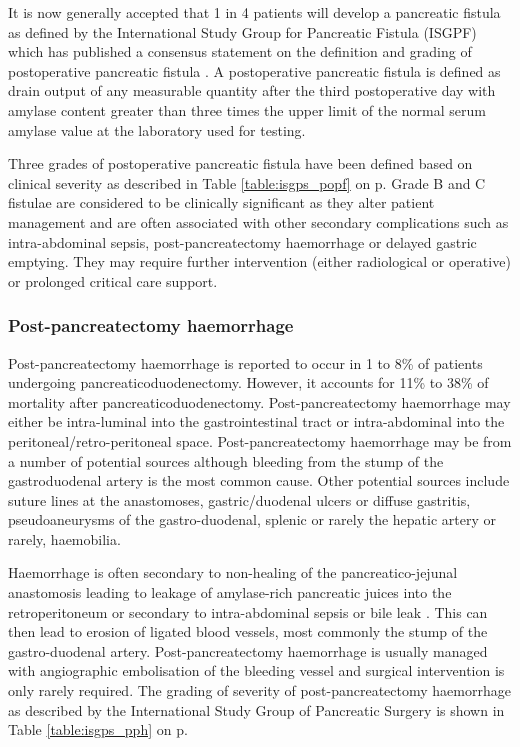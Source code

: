 It is now generally accepted that 1 in 4 patients will develop a pancreatic fistula as defined by the International Study Group for Pancreatic Fistula (ISGPF) which has published a consensus statement on the definition and grading of postoperative pancreatic fistula \parencite{bassi_postoperative_2005}. 
A postoperative pancreatic fistula is defined as drain output of any measurable quantity after the third postoperative day with amylase content greater than three times the upper limit of the normal serum amylase value at the laboratory used for testing. 

Three grades of postoperative pancreatic fistula have been defined based on clinical severity as described in Table \ref{table:isgps_popf} on p\pageref{table:isgps_popf}. 
Grade B and C fistulae are considered to be clinically significant as they alter patient management and are often associated with other secondary complications such as intra-abdominal sepsis, post-pancreatectomy haemorrhage or delayed gastric emptying. 
They may require further intervention (either radiological or operative) or prolonged critical care support. 

\subsubsection{Post-pancreatectomy haemorrhage}
\label{sec:ch_intro_PPH}
Post-pancreatectomy haemorrhage is reported to occur in 1 to 8\% of patients undergoing pancreaticoduodenectomy. 
However, it accounts for 11\% to 38\% of mortality after pancreaticoduodenectomy. 
Post-pancreatectomy haemorrhage may either be intra-luminal into the gastrointestinal tract or intra-abdominal into the peritoneal/retro-peritoneal space. 
Post-pancreatectomy haemorrhage may be from a number of potential sources although bleeding from the stump of the gastroduodenal artery is the most common cause. 
Other potential sources include suture lines at the anastomoses, gastric/duodenal ulcers or diffuse gastritis, pseudoaneurysms of the gastro-duodenal, splenic or rarely the hepatic artery or rarely, haemobilia.

Haemorrhage is often secondary to non-healing of the pancreatico-jejunal anastomosis leading to leakage of amylase-rich pancreatic juices into the retroperitoneum or secondary to intra-abdominal sepsis or bile leak \parencite{tien_risk_2005, koukoutsis_haemorrhage_2006, choi_delayed_2004, balladur_bleeding_1996}. 
This can then lead to erosion of ligated blood vessels, most commonly the stump of the gastro-duodenal artery. 
Post-pancreatectomy haemorrhage is usually managed with angiographic embolisation of the bleeding vessel and surgical intervention is only rarely required. 
The grading of severity of post-pancreatectomy haemorrhage as described by the International Study Group of Pancreatic Surgery \parencite{wente_postpancreatectomy_2007} is shown in Table \ref{table:isgps_pph} on p\pageref{table:isgps_pph}.

